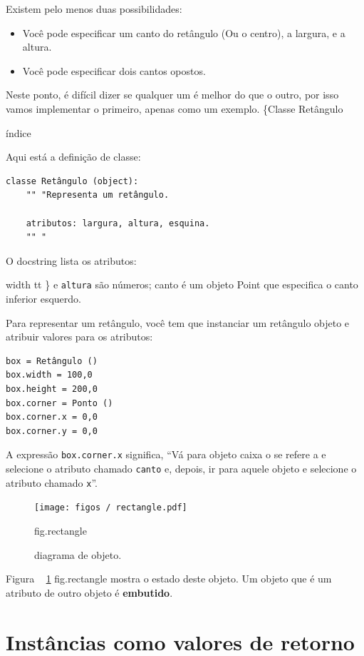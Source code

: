 \documentclass[10pt]{book}
\begin{document}
\begin{exercise}
\begin{v erbatim}
{Existem pelo menos duas possibilidades: 

\begin{itemize}

\item Você pode especificar um canto do retângulo
(Ou o centro), a largura, e a altura.

\item Você pode especificar dois cantos opostos.

\end{itemize}

Neste ponto, é difícil dizer se qualquer um é melhor do que
o outro, por isso vamos implementar o primeiro, apenas como um exemplo.
\{Classe Retângulo} índice

Aqui está a definição de classe:

\begin{verbatim}
classe Retângulo (object):
    "" "Representa um retângulo. 

    atributos: largura, altura, esquina.
    "" "
\end{verbatim}
%
O docstring lista os atributos: {width tt \} e
{\tt altura} são números; {canto \tt} é um objeto Point que
especifica o canto inferior esquerdo.

Para representar um retângulo, você tem que instanciar um retângulo
objeto e atribuir valores para os atributos:

\begin{verbatim}
box = Retângulo ()
box.width = 100,0
box.height = 200,0
box.corner = Ponto ()
box.corner.x = 0,0
box.corner.y = 0,0
\end{verbatim}
%
A expressão {\tt box.corner.x} significa,
``Vá para objeto {caixa \tt} o se refere a e selecione o atributo chamado
{\tt canto} e, depois, ir para aquele objeto e selecione o atributo chamado
{\tt x}''.

\begin{figure}
\centerline
{\texttt{[image: figos / rectangle.pdf]}}
\caption{diagrama de objeto.}
\label{} fig.rectangle
\end{figure}


Figura ~ \ref {} fig.rectangle mostra o estado deste objeto.
Um objeto que é um atributo de outro objeto é {\bf embutido}.


\section {Instâncias como valores de retorno}

}
\end{v erbatim}
\end{exercise}
\end{document}
